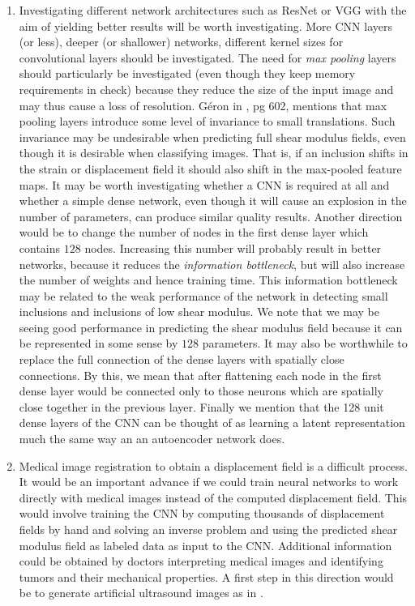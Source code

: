 \documentclass[12pt]{article}
\begin{document}
\begin{enumerate}
\item{Investigating different network architectures such as ResNet \cite{conf:resnet} or VGG \cite{conf:vgg} with the aim of yielding better results will be worth investigating. More CNN layers (or less), deeper (or shallower) networks, different kernel sizes for convolutional layers should be investigated. The need for \textit{max pooling} layers should particularly be investigated (even though they keep memory requirements in check) because they reduce the size of the input image and may thus cause a loss of resolution. G\'{e}ron in \cite{book:geron2019}, pg 602, mentions that max pooling layers introduce some level of invariance to small translations. Such invariance may be undesirable when predicting full shear modulus fields, even though it is desirable when classifying images. That is, if an inclusion shifts in the strain or displacement field it should also shift in the max-pooled feature maps. It may be worth investigating whether a CNN is required at all and whether a simple dense network, even though it will cause an explosion in the number of parameters, can produce similar quality results. Another direction would be to change the number of nodes in the first dense layer which contains $128$ nodes. Increasing this number will probably result in better networks, because it reduces the \textit{information bottleneck}\cite{book:chollet}, but will also increase the number of weights and hence training time. This information bottleneck may be related to the weak performance of the network in detecting small inclusions and inclusions of low shear modulus. We note that we may be seeing good performance in predicting the shear modulus field because it can be represented in some sense by $128$ parameters. It may also be worthwhile to replace the full connection of the dense layers with spatially close connections. By this, we mean that after flattening each node in the first dense layer would be connected only to those neurons which are spatially close together in the previous layer. Finally we mention that the 128 unit dense layers of the CNN can be thought of as learning a latent representation much the same way an an autoencoder network does.}
\item{Medical image registration to obtain a displacement field is a difficult process. It would be an important advance if we could train neural networks to work directly with medical images instead of the computed displacement field. This would involve training the CNN by computing thousands of displacement fields by hand and solving an inverse problem and using the predicted shear modulus field as labeled data as input to the CNN. Additional information could be obtained by doctors interpreting medical images and identifying tumors and their mechanical properties. A first step in this direction would be to generate artificial ultrasound images as in \cite{paper:doyley}.}

\end{enumerate}
\end{document}
